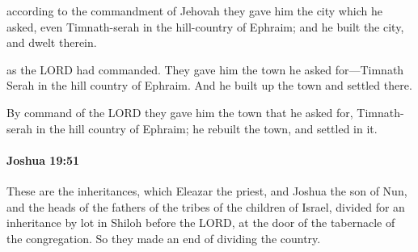 			\begin{versebox}
					\item[BHS] 
					\item[ASV] according to the commandment of Jehovah they gave him the city which he asked, even Timnath-serah in the hill-country of Ephraim; and he built the city, and dwelt therein.
					\item[NIV] as the LORD had commanded. They gave him the town he asked for—Timnath Serah in the hill country of Ephraim. And he built up the town and settled there.
					\item[NRSV] By command of the LORD they gave him the town that he asked for, Timnath-serah in the hill country of Ephraim; he rebuilt the town, and settled in it.
			\end{versebox}

		\paragraph{Joshua 19:51} %
			\label{JOSHUA-19-51}

			These are the inheritances, which Eleazar the priest, and Joshua the son of Nun, and the heads of the fathers of the tribes of the children of Israel, divided for an inheritance by lot in Shiloh before the LORD, at the door of the tabernacle of the congregation. So they made an end of dividing the country.

